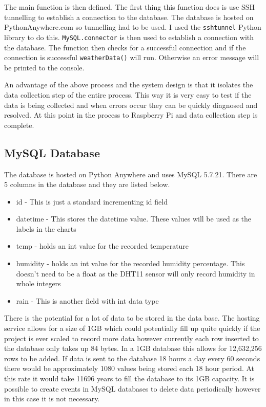 \documentclass[10pt,a4paper]{article}
\begin{document}
The main function is then defined. The first thing this function does is use SSH tunnelling to establish a connection to the database. The database is hosted on PythonAnywhere.com so tunnelling had to be used. I used the \texttt{sshtunnel} Python library to do this. \texttt{MySQL.connector} is then used to establish a connection with the database. The function then checks for a successful connection and if the connection is successful \texttt{weatherData()} will run. Otherwise an error message will be printed to the console. 

An advantage of the above process and the system design is that it isolates the data collection step of the entire process. This way it is very easy to test if the data is being collected and when errors occur they can be quickly diagnosed and resolved. At this point in the process to Raspberry Pi and data collection step is complete. 

\subsection{MySQL Database}
The database is hosted on Python Anywhere and uses MySQL 5.7.21. There are 5 columns in the database and they are listed below. 
\begin{itemize}
\item id - This is just a standard incrementing id field
\item datetime - This stores the datetime value. These values will be used as the labels in the charts
\item temp - holds an int value for the recorded temperature
\item humidity - holds an int value for the recorded humidity percentage. This doesn't need to be a float as the DHT11 sensor will only record humidity in whole integers
\item rain - This is another field with int data type
\end{itemize}

There is the potential for a lot of data to be stored in the data base. The hosting service allows for a size of 1GB which could potentially fill up quite quickly if the project is ever scaled to record more data however currently each row inserted to the database only takes up 84 bytes. In a 1GB database this allows for 12,632,256 rows to be added. If data is sent to the database 18 hours a day every 60 seconds there would be approximately 1080 values being stored each 18 hour period. At this rate it would take 11696 years to fill the database to its 1GB capacity. It is possible to create events in MySQL databases to delete data periodically however in this case it is not necessary. 
\end{document}
